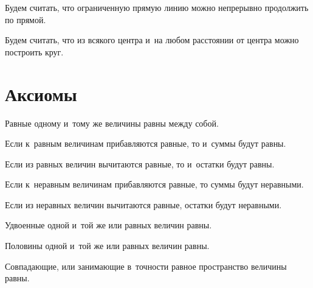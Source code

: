 \documentclass[letters,booklanguage=russian]{byrnebook}
\begin{document}
\startpostulate{}\label{post:I.II}
\begin{center}
Будем считать, что ограниченную прямую линию можно непрерывно продолжить по прямой.
\end{center}

\startpostulate{}\label{post:I.III}
\begin{center}
Будем считать, что из всякого центра и~на любом расстоянии от центра можно построить круг.
\end{center}

\chapter*{Аксиомы}

\startaxiom{}\label{ax:I.I}
\begin{center}
Равные одному и~тому же величины равны между собой.
\end{center}

\startaxiom{}\label{ax:I.II}
\begin{center}
Если к~равным величинам прибавляются равные, то и~суммы будут равны.
\end{center}

\startaxiom{}\label{ax:I.III}
\begin{center}
Если из равных величин вычитаются равные, то и~остатки будут равны.
\end{center}

\startaxiom{}\label{ax:I.IV}
\begin{center}
Если к~неравным величинам прибавляются равные, то суммы будут неравными.
\end{center}

\startaxiom{}\label{ax:I.V}
\begin{center}
Если из неравных величин вычитаются  равные, остатки будут неравными.
\end{center}

\startaxiom{}\label{ax:I.VI}
\begin{center}
Удвоенные одной и~той же или равных величин равны.
\end{center}

\startaxiom{}\label{ax:I.VII}
\begin{center}
Половины одной и~той же или равных величин равны.
\end{center}

\startaxiom{}\label{ax:I.VIII}
\begin{center}
Совпадающие, или занимающие в~точности равное пространство величины равны.
\end{center}
\end{document}
